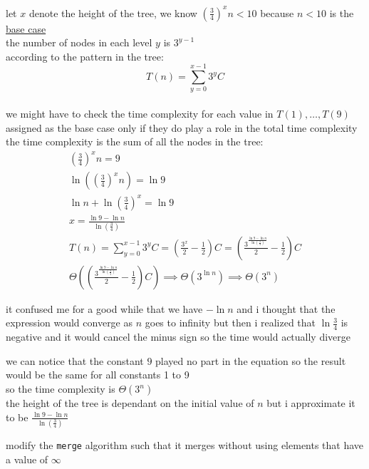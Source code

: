 \documentclass[a4paper,12pt]{article}
\begin{document}
\begin{question}
\begin{subquestion}
\begin{answer}
let \(x\) denote the height of the tree, we know \(\left(\frac{3}{4}\right)^xn < 10\) because \(n < 10\) is the \href{20221105001640-recursive_function.org}{base case}\\
the number of nodes in each level \(y\) is \(3^{y-1}\)\\
according to the pattern in the tree:\\
\[
T(n) = \sum_{y=0}^{x-1} 3^yC
\]\\
we might have to check the time complexity for each value in \(T(1),\dots,T(9)\) assigned as the base case only if they do play a role in the total time complexity\\
the time complexity is the sum of all the nodes in the tree:\\
\begin{gather*}
  \left(\frac{3}{4}\right)^xn = 9\\
  \ln\left(\left(\frac{3}{4}\right)^xn\right) = \ln9\\
  \ln{n} + \ln\left(\frac{3}{4}\right)^x = \ln9\\
  x = \frac{\ln9 - \ln n}{\ln\left(\frac{3}{4}\right)}\\
  T(n) = \sum_{y=0}^{x-1} 3^yC = \left(\frac{3^x}{2} - \frac{1}{2}\right)C = \left(\frac{3^\frac{\ln9 - \ln n}{\ln\left(\frac{3}{4}\right)}}{2} - \frac{1}{2}\right)C\\
  \Theta\left(\left(\frac{3^\frac{\ln9 - \ln n}{\ln\left(\frac{3}{4}\right)}}{2} - \frac{1}{2}\right)C\right) \implies \Theta\left(3^{\ln n}\right) \implies \Theta(3^n)
\end{gather*}
\begin{note}
it confused me for a good while that we have \(-\ln n\) and i thought that the expression would converge as \(n\) goes to infinity but then i realized that \(\ln\frac34\) is negative and it would cancel the minus sign so the time would actually diverge\\
\end{note}
we can notice that the constant \(9\) played no part in the equation so the result would be the same for all constants 1 to 9\\
so the time complexity is \(\Theta\left(3^n\right)\)\\
the height of the tree is dependant on the initial value of \(n\) but i approximate it to be \(\frac{\ln9 - \ln n}{\ln\left(\frac{3}{4}\right)}\)\\
\end{answer}
\end{subquestion}
\end{question}

\begin{question}
modify the \texttt{merge} algorithm such that it merges without using elements that have a value of \(\infty\)\\
\begin{answer}
\begin{center}

\end{center}
\end{answer}
\end{question}
\end{document}
